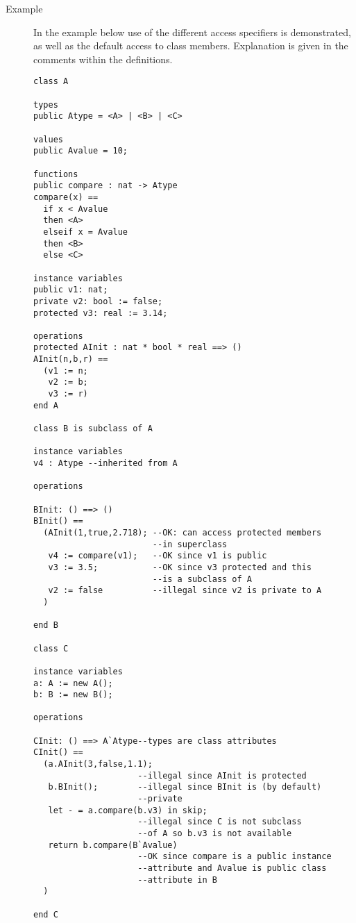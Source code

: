 \documentclass{overturerepchap}
\begin{document}
\begin{description}
\item[Example] In the example below use of the different access
  specifiers is demonstrated, as well as the default access to class
  members. Explanation is given in the comments within the definitions.
\begin{lstlisting}
class A

types
public Atype = <A> | <B> | <C>

values
public Avalue = 10;

functions
public compare : nat -> Atype
compare(x) ==
  if x < Avalue
  then <A>
  elseif x = Avalue
  then <B>
  else <C>
 
instance variables
public v1: nat;
private v2: bool := false;
protected v3: real := 3.14;

operations
protected AInit : nat * bool * real ==> ()
AInit(n,b,r) ==
  (v1 := n;
   v2 := b;
   v3 := r)
end A

class B is subclass of A

instance variables
v4 : Atype --inherited from A

operations

BInit: () ==> ()
BInit() ==
  (AInit(1,true,2.718); --OK: can access protected members
                        --in superclass
   v4 := compare(v1);   --OK since v1 is public
   v3 := 3.5;           --OK since v3 protected and this 
                        --is a subclass of A
   v2 := false          --illegal since v2 is private to A
  )

end B

class C

instance variables
a: A := new A();
b: B := new B();

operations

CInit: () ==> A`Atype--types are class attributes
CInit() ==
  (a.AInit(3,false,1.1);  
                     --illegal since AInit is protected
   b.BInit();        --illegal since BInit is (by default) 
                     --private
   let - = a.compare(b.v3) in skip;
                     --illegal since C is not subclass 
                     --of A so b.v3 is not available
   return b.compare(B`Avalue)
                     --OK since compare is a public instance
                     --attribute and Avalue is public class
                     --attribute in B
  )

end C
\end{lstlisting}
  


\end{description}
\end{document}
